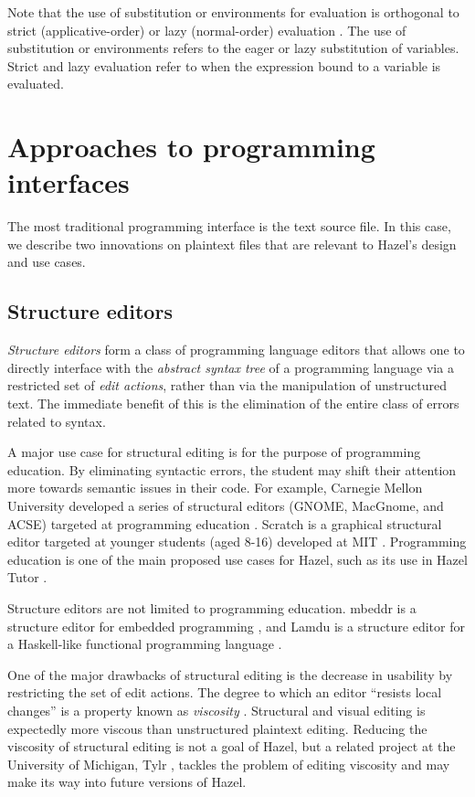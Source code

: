 Note that the use of substitution or environments for evaluation is orthogonal to strict (applicative-order) or lazy (normal-order) evaluation \cite{plotkin1975call}. The use of substitution or environments refers to the eager or lazy substitution of variables. Strict and lazy evaluation refer to when the expression bound to a variable is evaluated.

\section{Approaches to programming interfaces}
\label{sec:prog-intf}

The most traditional programming interface is the text source file. In this case, we describe two innovations on plaintext files that are relevant to Hazel's design and use cases.

\subsection{Structure editors}
\label{sec:structure-editors}

\textit{Structure editors} form a class of programming language editors that allows one to directly interface with the \textit{abstract syntax tree} of a programming language via a restricted set of \textit{edit actions}, rather than via the manipulation of unstructured text. The immediate benefit of this is the elimination of the entire class of errors related to syntax.

A major use case for structural editing is for the purpose of programming education. By eliminating syntactic errors, the student may shift their attention more towards semantic issues in their code. For example, Carnegie Mellon University developed a series of structural editors (GNOME, MacGnome, and ACSE)  targeted at programming education \cite{miller1994evolution}. Scratch is a graphical structural editor targeted at younger students (aged 8-16) developed at MIT \cite{maloney2010scratch}. Programming education is one of the main proposed use cases for Hazel, such as its use in Hazel Tutor \cite{potter2020hazel}.

Structure editors are not limited to programming education. mbeddr is a structure editor for embedded programming \cite{voelter2012mbeddr}, and Lamdu is a structure editor for a Haskell-like functional programming language \cite{lotem_chuchem}.

One of the major drawbacks of structural editing is the decrease in usability by restricting the set of edit actions. The degree to which an editor ``resists local changes'' is a property known as \textit{viscosity} \cite{green1989cognitive}. Structural and visual editing is expectedly more viscous than unstructured plaintext editing. Reducing the viscosity of structural editing is not a goal of Hazel, but a related project at the University of Michigan, Tylr \cite{tylr}, tackles the problem of editing viscosity and may make its way into future versions of Hazel.

